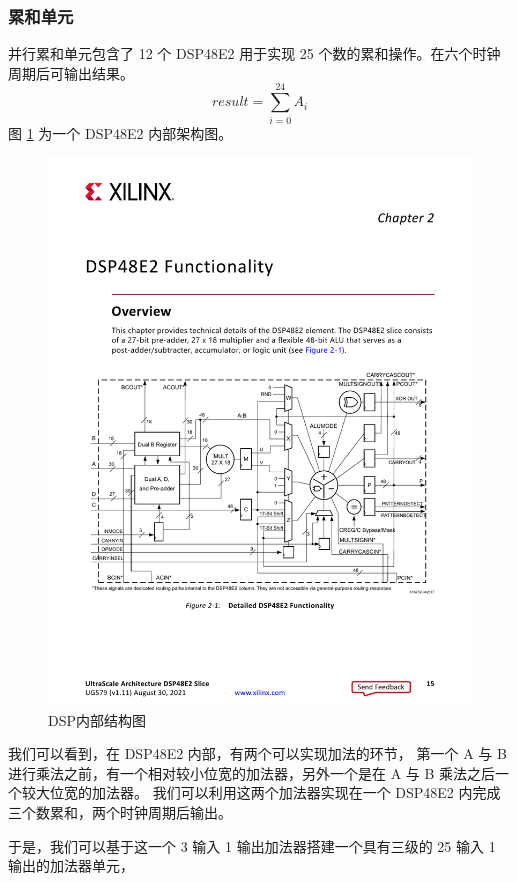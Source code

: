\documentclass[12pt, a4paper, oneside]{ctexbook}
\begin{document}
	\subsubsection{累和单元}
	并行累和单元包含了 12 个 DSP48E2 用于实现 25 个数的累和操作。在六个时钟周期后可输出结果。
	\begin{equation} \label{sum}
		result = \sum_{i=0}^{24}A_i
	\end{equation}
	图 \ref{DSP} 为一个 DSP48E2 内部架构图。
	\begin{figure}[h]
		\centering
		\includegraphics[scale=0.87]{pic/DSP}
		\caption{DSP内部结构图}
		\label{DSP}
	\end{figure}
	\par 我们可以看到，在 DSP48E2 内部，有两个可以实现加法的环节，
	第一个 A 与 B 进行乘法之前，有一个相对较小位宽的加法器，另外一个是在 A 与 B 乘法之后一个较大位宽的加法器。
	我们可以利用这两个加法器实现在一个 DSP48E2 内完成三个数累和，两个时钟周期后输出。
	\par 于是，我们可以基于这一个 3 输入 1 输出加法器搭建一个具有三级的 25 输入 1 输出的加法器单元，
\end{document}
